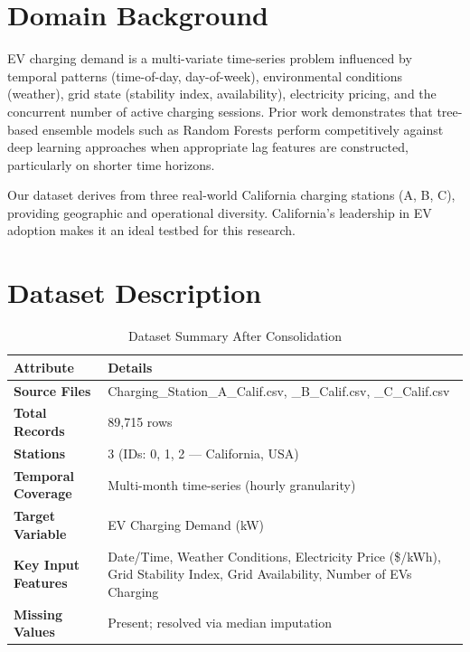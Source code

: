 \documentclass[12pt, a4paper]{article}
\begin{document}
\section{Domain Background}

EV charging demand is a multi-variate time-series problem influenced by temporal
patterns (time-of-day, day-of-week), environmental conditions (weather), grid state
(stability index, availability), electricity pricing, and the concurrent number of
active charging sessions. Prior work demonstrates that tree-based ensemble models
such as Random Forests perform competitively against deep learning approaches when
appropriate lag features are constructed, particularly on shorter time horizons.

Our dataset derives from three real-world California charging stations (A, B, C),
providing geographic and operational diversity. California's leadership in EV adoption
makes it an ideal testbed for this research.

\section{Dataset Description}

\begin{table}[h!]
\centering
\caption{Dataset Summary After Consolidation}
\renewcommand{\arraystretch}{1.4}
\begin{tabularx}{\textwidth}{>{\bfseries}lX}
\toprule
\rowcolor{tableheader}
\color{white}Attribute & \color{white}Details \\
\midrule
Source Files      & Charging\_Station\_A\_Calif.csv, \_B\_Calif.csv, \_C\_Calif.csv \\
\rowcolor{lightgray}
Total Records     & 89,715 rows \\
Stations          & 3 (IDs: 0, 1, 2 --- California, USA) \\
\rowcolor{lightgray}
Temporal Coverage & Multi-month time-series (hourly granularity) \\
Target Variable   & EV Charging Demand (kW) \\
\rowcolor{lightgray}
Key Input Features & Date/Time, Weather Conditions, Electricity Price (\$/kWh), Grid Stability Index, Grid Availability, Number of EVs Charging \\
Missing Values    & Present; resolved via median imputation \\
\bottomrule
\end{tabularx}
\end{table}
\end{document}
